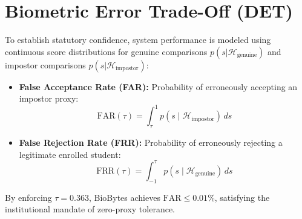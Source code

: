 \section{Biometric Error Trade-Off (DET)}
To establish statutory confidence, system performance is modeled using continuous score distributions for genuine comparisons $p(s | \mathcal{H}_{\text{genuine}})$ and impostor comparisons $p(s | \mathcal{H}_{\text{impostor}})$:
\begin{itemize}
    \item \textbf{False Acceptance Rate (FAR):} Probability of erroneously accepting an impostor proxy:
    \begin{equation}
    \text{FAR}(\tau) = \int_{\tau}^{1} p(s \mid \mathcal{H}_{\text{impostor}}) \, ds
    \end{equation}
    \item \textbf{False Rejection Rate (FRR):} Probability of erroneously rejecting a legitimate enrolled student:
    \begin{equation}
    \text{FRR}(\tau) = \int_{-1}^{\tau} p(s \mid \mathcal{H}_{\text{genuine}}) \, ds
    \end{equation}
\end{itemize}
By enforcing $\tau = 0.363$, BioBytes achieves $\text{FAR} \leq 0.01\%$, satisfying the institutional mandate of zero-proxy tolerance.
